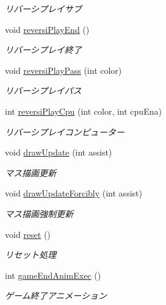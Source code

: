 \begin{DoxyCompactItemize}
\begin{DoxyCompactList}\small\item\em リバーシプレイサブ \end{DoxyCompactList}\item 
void \hyperlink{class_reversi_wpf_1_1_reversi_play_a091d27bec4b3570ab595a49170342105}{reversi\+Play\+End} ()
\begin{DoxyCompactList}\small\item\em リバーシプレイ終了 \end{DoxyCompactList}\item 
void \hyperlink{class_reversi_wpf_1_1_reversi_play_a3aca2f66c873be50dca194a396d34bd7}{reversi\+Play\+Pass} (int color)
\begin{DoxyCompactList}\small\item\em リバーシプレイパス \end{DoxyCompactList}\item 
int \hyperlink{class_reversi_wpf_1_1_reversi_play_ab9824cdb1bc61ac894ea237b732bd166}{reversi\+Play\+Cpu} (int color, int cpu\+Ena)
\begin{DoxyCompactList}\small\item\em リバーシプレイコンピューター \end{DoxyCompactList}\item 
void \hyperlink{class_reversi_wpf_1_1_reversi_play_ae64bc4578a896ccd8fcff7b35763cf2e}{draw\+Update} (int assist)
\begin{DoxyCompactList}\small\item\em マス描画更新 \end{DoxyCompactList}\item 
void \hyperlink{class_reversi_wpf_1_1_reversi_play_a0324e804add5c651915266f0254eb26f}{draw\+Update\+Forcibly} (int assist)
\begin{DoxyCompactList}\small\item\em マス描画強制更新 \end{DoxyCompactList}\item 
void \hyperlink{class_reversi_wpf_1_1_reversi_play_aee0447f5d955d0b2b66d14b491d90e81}{reset} ()
\begin{DoxyCompactList}\small\item\em リセット処理 \end{DoxyCompactList}\item 
int \hyperlink{class_reversi_wpf_1_1_reversi_play_a222edc5a1161d4859635ef87d46da59c}{game\+End\+Anim\+Exec} ()
\begin{DoxyCompactList}\small\item\em ゲーム終了アニメーション \end{DoxyCompactList}\item 

\end{DoxyCompactItemize}
